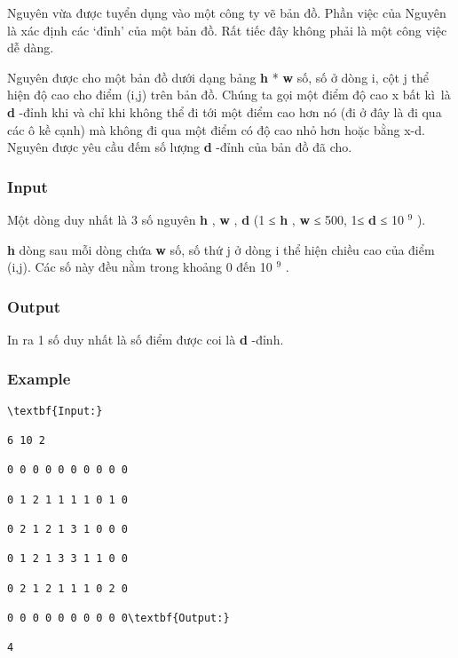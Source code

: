 



   Nguyên vừa được tuyển dụng vào một công ty vẽ bản đồ. Phần việc của Nguyên là xác định các ‘đỉnh’ của một bản đồ. Rất tiếc đây không phải là một công việc dễ dàng.  

   Nguyên được cho một bản đồ dưới dạng bảng   \textbf{    h   }   *   \textbf{    w   }   số, số ở dòng i, cột j thể hiện độ cao cho điểm (i,j) trên bản đồ. Chúng ta gọi một điểm độ cao x bất kì là   \textbf{    d   }   -đỉnh khi và chỉ khi không thể đi tới một điểm cao hơn nó (đi ở đây là đi qua các ô kề cạnh) mà không đi qua một điểm có độ cao nhỏ hơn hoặc bằng x-d. Nguyên được yêu cầu đếm số lượng   \textbf{    d   }   -đỉnh của bản đồ đã cho.  

\subsubsection{   Input  }

   Một dòng duy nhất là 3 số nguyên   \textbf{    h   }   ,   \textbf{    w   }   ,   \textbf{    d   }   (1 ≤   \textbf{    h   }   ,   \textbf{    w   }   ≤ 500, 1≤   \textbf{    d   }   ≤ 10   $^    9   $   ).  

\textbf{    h   }   dòng sau mỗi dòng chứa   \textbf{    w   }   số, số thứ j ở dòng i thể hiện chiều cao của điểm (i,j). Các số này đều nằm trong khoảng 0 đến 10   $^    9   $   .  

\subsubsection{   Output  }

   In ra 1 số duy nhất là số điểm được coi là   \textbf{    d   }   -đỉnh.  

\subsubsection{   Example  }
\begin{verbatim}
\textbf{Input:}

6 10 2

0 0 0 0 0 0 0 0 0 0

0 1 2 1 1 1 1 0 1 0

0 2 1 2 1 3 1 0 0 0

0 1 2 1 3 3 1 1 0 0

0 2 1 2 1 1 1 0 2 0

0 0 0 0 0 0 0 0 0 0\textbf{Output:}

4\end{verbatim}